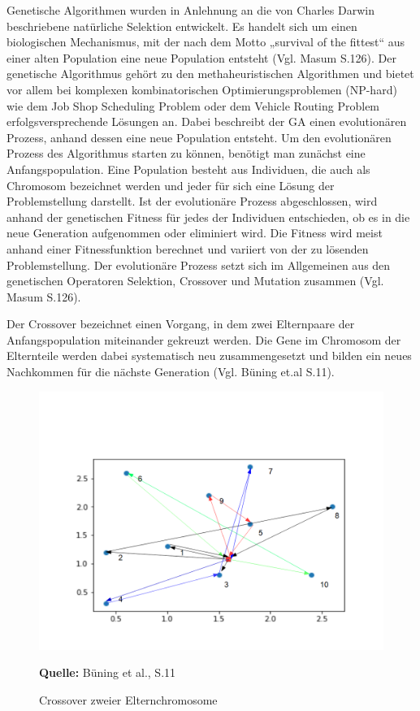 \documentclass[a4paper,12pt,parskip,bibtotoc,liststotoc]{article}
\begin{document}
Genetische Algorithmen wurden in Anlehnung an die von Charles Darwin beschriebene natürliche Selektion entwickelt. Es handelt sich um einen biologischen Mechanismus, mit der nach dem Motto „survival of the fittest“ aus einer alten Population eine neue Population entsteht (Vgl. Masum S.126).
Der genetische Algorithmus gehört zu den methaheuristischen Algorithmen und bietet vor allem bei komplexen kombinatorischen Optimierungsproblemen (NP-hard) wie dem Job Shop Scheduling Problem oder dem Vehicle Routing Problem erfolgsversprechende Lösungen an. 
Dabei beschreibt der GA einen evolutionären Prozess, anhand dessen eine neue Population entsteht.
Um den evolutionären Prozess des Algorithmus starten zu können, benötigt man zunächst eine Anfangspopulation. 
Eine Population besteht aus Individuen, die auch als Chromosom bezeichnet werden und jeder für sich eine Lösung der Problemstellung darstellt.
Ist der evolutionäre Prozess abgeschlossen, wird anhand der genetischen Fitness für jedes der Individuen entschieden, ob es in die neue Generation aufgenommen oder eliminiert wird. 
Die Fitness wird meist anhand einer Fitnessfunktion berechnet und variiert von der zu lösenden Problemstellung.
Der evolutionäre Prozess setzt sich im Allgemeinen aus den genetischen Operatoren Selektion, Crossover und Mutation zusammen (Vgl. Masum S.126).
 
Der Crossover bezeichnet einen Vorgang, in dem zwei Elternpaare der Anfangspopulation miteinander gekreuzt werden. 
Die Gene im Chromosom der Elternteile werden dabei systematisch neu zusammengesetzt und bilden ein neues Nachkommen für die nächste Generation (Vgl. Büning et.al S.11).


\begin{figure}[h!]
  \begin{center}
    \includegraphics[width=150mm]{vrppp2.png}
    \caption{ Crossover zweier Elternchromosome }  \label{Typen}
    {\footnotesize \textbf{Quelle:} Büning et al., S.11}
  \end{center}
\end{figure}
\end{document}
